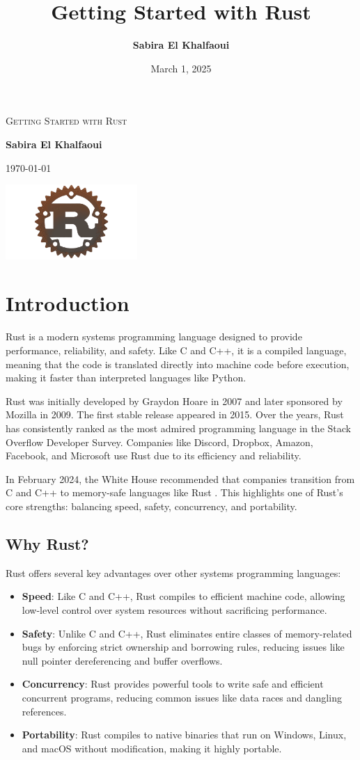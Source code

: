 \documentclass[a4paper,12pt]{report}
\title{\textbf{ \color{rustorange}Getting Started with Rust}}
\author{\large \color{rustorange}\textbf{Sabira El Khalfaoui}}
\date{ \color{rustorange}March 1, 2025}
\renewcommand{\maketitle}{
	\begin{center}
		{\scshape \huge \color{rustorange}Getting Started with Rust}\par\vspace{1cm}
		{\Large \color{rustorange}\textbf{Sabira El Khalfaoui}}\par\vspace{1cm}
		{\large \color{rustorange}\today}\par\vspace{1cm}
		
		\includegraphics[width=5cm]{rust_logo.png}
	\end{center}
}
\begin{document}
	
	\maketitle
	\renewcommand{\contentsname}{\color{rustorange}\textbf{Table of Contents}}
	
	\tableofcontents
	
	\newpage
	\section*{Introduction}
	Rust is a modern systems programming language designed to provide performance, reliability, and safety. Like C and C++, it is a compiled language, meaning that the code is translated directly into machine code before execution, making it faster than interpreted languages like Python.
	
	Rust was initially developed by Graydon Hoare in 2007 and later sponsored by Mozilla in 2009. The first stable release appeared in 2015. Over the years, Rust has consistently ranked as the most admired programming language in the Stack Overflow Developer Survey. Companies like Discord, Dropbox, Amazon, Facebook, and Microsoft use Rust due to its efficiency and reliability.
	
	In February 2024, the White House recommended that companies transition from C and C++ to memory-safe languages like Rust \cite{whitehouse2024}. This highlights one of Rust’s core strengths: balancing speed, safety, concurrency, and portability.
	
	\subsection*{Why Rust?}
	Rust offers several key advantages over other systems programming languages:
	\begin{itemize}
		\item \textbf{Speed}: Like C and C++, Rust compiles to efficient machine code, allowing low-level control over system resources without sacrificing performance.
		\item \textbf{Safety}: Unlike C and C++, Rust eliminates entire classes of memory-related bugs by enforcing strict ownership and borrowing rules, reducing issues like null pointer dereferencing and buffer overflows.
		\item \textbf{Concurrency}: Rust provides powerful tools to write safe and efficient concurrent programs, reducing common issues like data races and dangling references.
		\item \textbf{Portability}: Rust compiles to native binaries that run on Windows, Linux, and macOS without modification, making it highly portable.
	\end{itemize}
	
\end{document}
